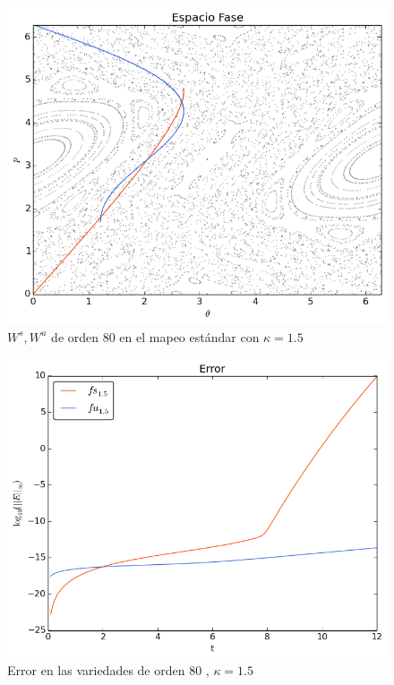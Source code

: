 \begin{figure}[H]
\centering
\includegraphics[scale=0.6]{estandark15}
\caption{$W^{s},W^{u}$ de orden 80 en el mapeo estándar con $\kappa=1.5$}
\label{estandar15}
\end{figure}

\begin{figure}[H]
\centering
\includegraphics[scale=0.6]{error_est_k15} 
\caption{Error en las variedades de orden 80 , $\kappa=1.5$}
\label{error est k15}
\end{figure}




